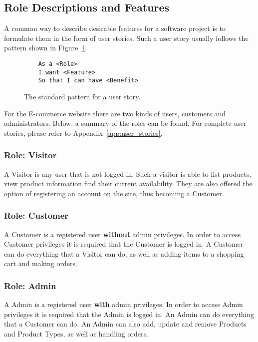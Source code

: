 \subsection{Role Descriptions and Features}

A common way to describe desirable features for a software project is to
formulate them in the form of user stories. Such a user story usually follows
the pattern shown in Figure~\ref{fig:user_story}.

\begin{figure}[H]
  \centering
  \begin{verbatim}
    As a <Role>
    I want <Feature>
    So that I can have <Benefit>
  \end{verbatim}
  \caption{\label{fig:user_story} The standard pattern for a user story.}
\end{figure}

For the E-commerce website there are two kinds of users, customers and
administrators. Below, a summary of the roles can be found. For complete user
stories, please refer to Appendix~\ref{app:user_stories}.

\subsubsection{Role: Visitor}\label{sec:visitor_role}

A Visitor is any user that is not logged in. Such a visitor is able to list
products, view product information find their current availability. They are
also offered the option of registering an account on the site, thus becoming
a Customer.

\subsubsection{Role: Customer}\label{sec:user_role}

A Customer is a registered user \textbf{without} admin privileges. In order to
access Customer privileges it is required that the Customer is logged in.
A Customer can do everything that a Visitor can do, as well as adding items
to a shopping cart and making orders.

\subsubsection{Role: Admin}\label{sec:admin_role}

A Admin is a registered user \textbf{with} admin privileges. In order to access
Admin privileges it is required that the Admin is logged in. An Admin can do
everything that a Customer can do. An Admin can also add, update and remove
Products and Product Types, as well as handling orders.
